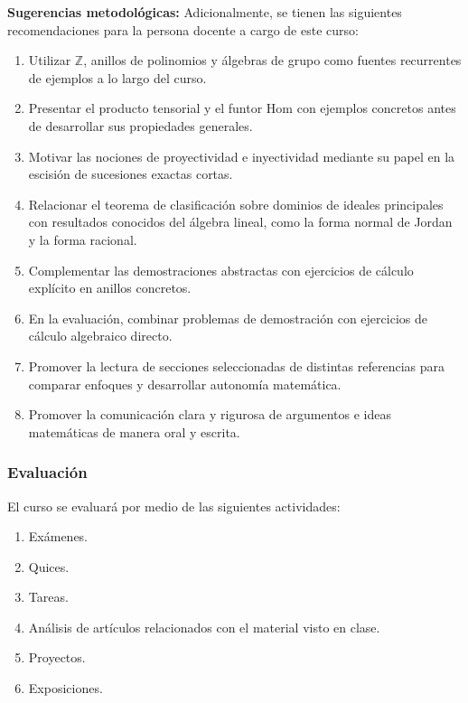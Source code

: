 \begin{refsection}
\textbf{Sugerencias metodológicas:} Adicionalmente, se tienen las siguientes recomendaciones para la persona docente a cargo de este curso:
\begin{enumerate}
    \item Utilizar $\mathbb{Z}$, anillos de polinomios y álgebras de grupo como fuentes recurrentes de ejemplos a lo largo del curso.
    \item Presentar el producto tensorial y el funtor $\mathrm{Hom}$ con ejemplos concretos antes de desarrollar sus propiedades generales.
    \item Motivar las nociones de proyectividad e inyectividad mediante su papel en la escisión de sucesiones exactas cortas.
    \item Relacionar el teorema de clasificación sobre dominios de ideales principales con resultados conocidos del álgebra lineal, como la forma normal de Jordan y la forma racional.
    \item Complementar las demostraciones abstractas con ejercicios de cálculo explícito en anillos concretos.
    \item En la evaluación, combinar problemas de demostración con ejercicios de cálculo algebraico directo.
    \item Promover la lectura de secciones seleccionadas de distintas referencias para comparar enfoques y desarrollar autonomía matemática.
    \item Promover la comunicación clara y rigurosa de argumentos e ideas matemáticas de manera oral y escrita.
\end{enumerate}


\subsubsection*{Evaluación}

El curso se evaluará por medio de las siguientes actividades:

\begin{enumerate}
\item Exámenes.
\item Quices.
\item Tareas.
\item Análisis de artículos relacionados con el material visto en clase.
\item Proyectos.
\item Exposiciones.
\end{enumerate}

\nocite{dummit2004abstract}
\nocite{lang2002algebra}
\nocite{rotman2010advanced}
\nocite{weibel1994homological}
\nocite{rotman2009homological}
\nocite{atiyah1969commutative}
\nocite{jacobson1989basic}
\printcursosbibliography

\end{refsection}
